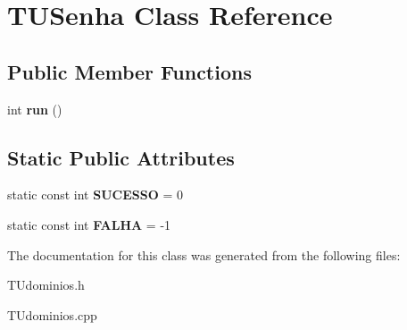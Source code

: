 \hypertarget{classTUSenha}{}\section{T\+U\+Senha Class Reference}
\label{classTUSenha}
\subsection*{Public Member Functions}
\begin{DoxyCompactItemize}
\item 
\mbox{\label{classTUSenha_ac5ddea52ed42b828961f343b82074125}} 
int {\bfseries run} ()
\end{DoxyCompactItemize}
\subsection*{Static Public Attributes}
\begin{DoxyCompactItemize}
\item 
\mbox{\label{classTUSenha_a1a1dabe034b25a899150c95acbc0684c}} 
static const int {\bfseries S\+U\+C\+E\+S\+SO} = 0
\item 
\mbox{\label{classTUSenha_a71eb0d9005b2d36da6a8530c0dd31842}} 
static const int {\bfseries F\+A\+L\+HA} = -\/1
\end{DoxyCompactItemize}


The documentation for this class was generated from the following files\+:\begin{DoxyCompactItemize}
\item 
T\+Udominios.\+h\item 
T\+Udominios.\+cpp\end{DoxyCompactItemize}
